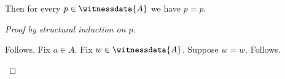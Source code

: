 

\begin{proposition}\label{witness_induction}
    Then for every $p\in\witnessdata{A}$ we have $p=p$.
\end{proposition}
\begin{proof}[Proof by structural induction on $p$]
    \begin{byCase}
         Follows.
            Fix $a\in A$.
            Fix $w\in\witnessdata{A}$.
            Suppose $w=w$.
            Follows.
    \end{byCase}
\end{proof}
